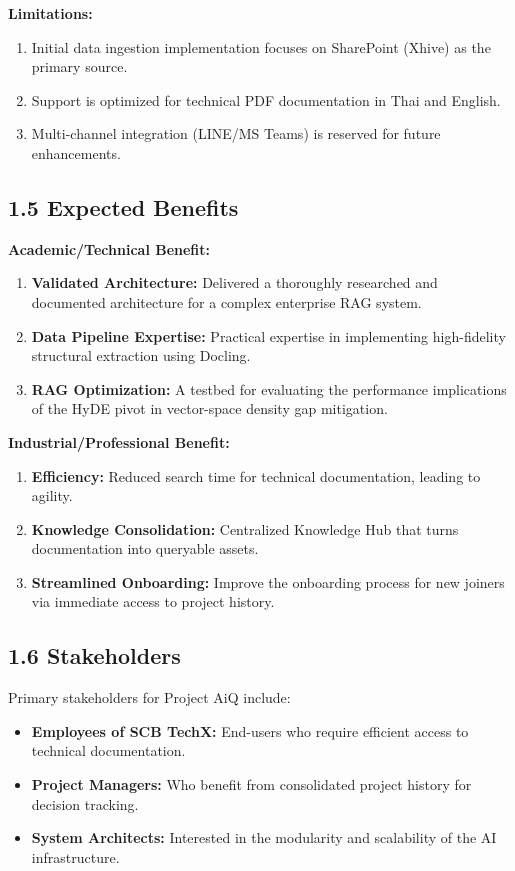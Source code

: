 \documentclass[12pt]{article}
\begin{document}
\textbf{Limitations:}
\begin{enumerate}
    \item Initial data ingestion implementation focuses on SharePoint (Xhive) as the primary source.
    \item Support is optimized for technical PDF documentation in Thai and English.
    \item Multi-channel integration (LINE/MS Teams) is reserved for future enhancements.
\end{enumerate}

\subsection{1.5 Expected Benefits}
\textbf{Academic/Technical Benefit:}
\begin{enumerate}
    \item \textbf{Validated Architecture:} Delivered a thoroughly researched and documented architecture for a complex enterprise RAG system.
    \item \textbf{Data Pipeline Expertise:} Practical expertise in implementing high-fidelity structural extraction using Docling.
    \item \textbf{RAG Optimization:} A testbed for evaluating the performance implications of the HyDE pivot in vector-space density gap mitigation.
\end{enumerate}

\textbf{Industrial/Professional Benefit:}
\begin{enumerate}
    \item \textbf{Efficiency:} Reduced search time for technical documentation, leading to agility.
    \item \textbf{Knowledge Consolidation:} Centralized Knowledge Hub that turns documentation into queryable assets.
    \item \textbf{Streamlined Onboarding:} Improve the onboarding process for new joiners via immediate access to project history.
\end{enumerate}

\subsection{1.6 Stakeholders}
Primary stakeholders for Project AiQ include:
\begin{itemize}
    \item \textbf{Employees of SCB TechX:} End-users who require efficient access to technical documentation.
    \item \textbf{Project Managers:} Who benefit from consolidated project history for decision tracking.
    \item \textbf{System Architects:} Interested in the modularity and scalability of the AI infrastructure.
\end{itemize}
\end{document}
